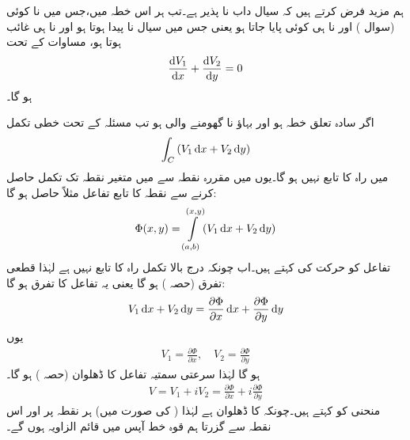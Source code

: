 ہم مزید فرض کرتے ہیں کہ سیال داب نا پذیر ہے۔تب ہر اس خطہ میں،جس میں نا کوئی  (سوال ) اور نا ہی کوئی  پایا جاتا ہو یعنی جس میں سیال نا پیدا ہوتا ہو اور نا ہی غائب ہوتا ہو، مساوات  کے تحت
\begin{align}\label{مساوات_مخفی_قوہ_داب_نا_پذیر_الف}
\frac{\dif V_1}{\dif x}+\frac{\dif V_2}{\dif y}=0
\end{align}
ہو گا۔

اگر  سادہ تعلق خطہ ہو اور بہاؤ نا گھومنے والی ہو تب مسئلہ  کے تحت خطی تکمل
\begin{align}
\int_C\, (V_1\dif x+V_2\dif y)
\end{align}
 میں راہ کا تابع نہیں ہو گا۔یوں  میں مقررہ نقطہ  سے  میں متغیر نقطہ  تک تکمل حاصل کرنے سے  نقطہ  کا تابع تفاعل مثلاً  حاصل ہو گا:
\begin{align}
\Phi(x,y)=\int\limits_{(a,b)}^{(x,y)} (V_1\dif x+V_2\dif y)
\end{align}
تفاعل  کو حرکت کی  کہتے ہیں۔اب چونکہ درج بالا تکمل راہ کا تابع نہیں  ہے لہٰذا  قطعی تفرق (حصہ ) ہو گا یعنی یہ تفاعل  کا تفرق ہو گا:
\begin{align}
V_1\dif x+V_2\dif y=\frac{\partial \Phi}{\partial x}\dif x+\frac{\partial \Phi}{\partial y}\dif y
\end{align}
یوں 
\begin{align}\label{مساوات_مخفی_قوہ_ڈھلوان_مخفی_الف}
V_1=\frac{\partial \Phi}{\partial x},\quad V_2=\frac{\partial \Phi}{\partial y}
\end{align}
ہو گا لہٰذا سرعتی سمتیہ تفاعل  کا ڈھلوان (حصہ ) ہو گا۔
\begin{align}
V=V_1+iV_2=\frac{\partial \Phi}{\partial x}+i\frac{\partial \Phi}{\partial y}
\end{align}
منحنی  کو  کہتے ہیں۔چونکہ  کا ڈھلوان  ہے لہٰذا ( کی صورت میں) ہر نقطہ پر  اور اس نقطہ سے گزرتا ہم قوہ خط آپس میں قائم الزاویہ ہوں گے۔ 

